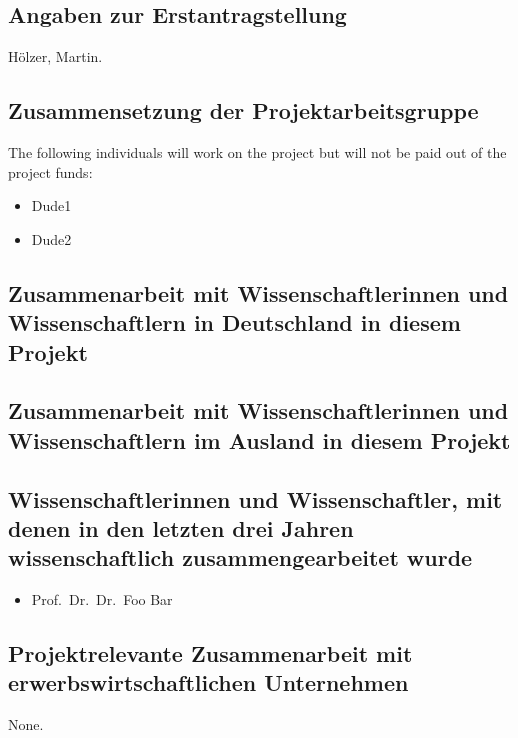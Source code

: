 \documentclass[ngerman]{scrartcl}
\begin{document}
\subsection{Angaben zur Erstantragstellung}
H\"olzer, Martin.

\subsection{Zusammensetzung der Projektarbeitsgruppe}
The following individuals will work on the project but will not be paid out of
the project funds:

\begin{itemize}
\item Dude1
\item Dude2
\end{itemize}

\subsection{Zusammenarbeit mit Wissenschaftlerinnen und Wissenschaftlern in Deutschland in diesem Projekt}

\subsection{Zusammenarbeit mit Wissenschaftlerinnen und Wissenschaftlern im Ausland in diesem Projekt}

\subsection{Wissenschaftlerinnen und Wissenschaftler, mit denen in den letzten 
drei Jahren wissenschaftlich zusammengearbeitet wurde}
\begin{itemize}
  \item Prof.\ Dr.\ Dr.\ Foo Bar
\end{itemize}

\subsection{Projektrelevante Zusammenarbeit mit erwerbswirtschaftlichen Unternehmen}
None.
\end{document}
